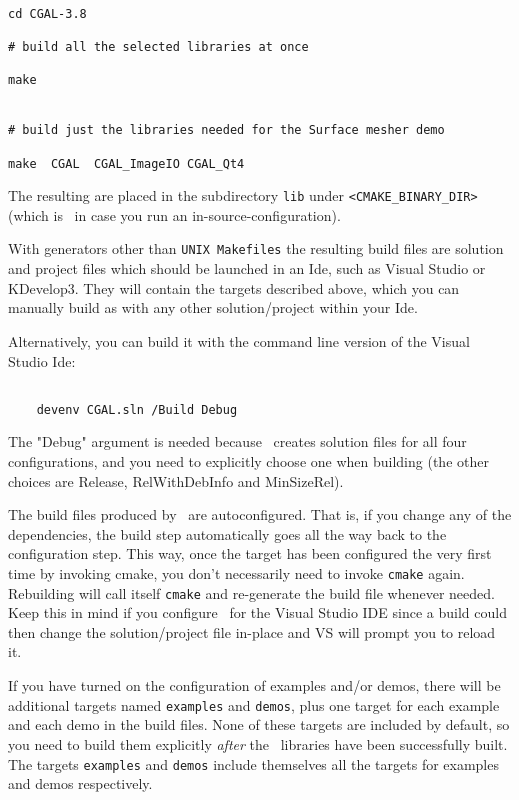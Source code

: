 {\ccTexHtml{\scriptsize}{}
\begin{verbatim}

cd CGAL-3.8

# build all the selected libraries at once

make 


# build just the libraries needed for the Surface mesher demo

make  CGAL  CGAL_ImageIO CGAL_Qt4

\end{verbatim}
}

The resulting are placed in the subdirectory {\tt lib} under {\tt <CMAKE\_BINARY\_DIR>}
(which is \cgaldir\ in case you run an in-source-configuration).

With generators other than {\tt UNIX Makefiles} the resulting build files
are solution and project files which
should be launched in an {\sc Ide}, such as Visual Studio or KDevelop3. They will contain the targets described
above, which you can manually build as with any other solution/project within your {\sc Ide}.

Alternatively, you can build it with the command line version of the
{\sc Visual Studio Ide}:

{\ccTexHtml{\scriptsize}{}
\begin{verbatim}

    devenv CGAL.sln /Build Debug

\end{verbatim}
}

The "Debug" argument is needed because \cmake\ creates solution files for
all four configurations, and you need to explicitly choose one when building
(the other choices are Release, RelWithDebInfo and MinSizeRel).


\begin{ccAdvanced}
The build files produced by \cmake\ are autoconfigured. That is, if you change any 
of the dependencies, the build step automatically goes all the way back to
the configuration step. This way, once the target has been configured the
very first time by
invoking cmake, you don't necessarily need to invoke \texttt{cmake} again. Rebuilding will call
itself \texttt{cmake} and re-generate the build file whenever needed. Keep this in mind if you
configure \cgal\ for the Visual Studio IDE since a build could then change the solution/project 
file in-place and VS will prompt you to reload it.
\end{ccAdvanced}


If you have turned on the configuration of examples and/or demos, there will be additional
targets named \texttt{examples} and \texttt{demos}, plus one target for
each example and each demo in the build files.
None of these targets are included by default, so you need to build them explicitly
{\em after} the \cgal\ libraries have been successfully built.
The targets \texttt{examples} and \texttt{demos} include themselves all the targets
for examples and demos respectively.

